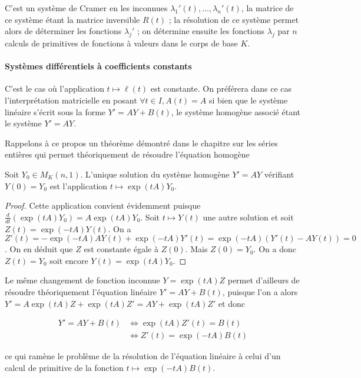 C'est un système de Cramer en les inconnues
$\lambda_1'(t),\ldots,\lambda_n'(t)$, la matrice de ce système étant la matrice inversible $R(t)$ ; la
résolution de ce système permet alors de déterminer les fonctions
$\lambda_j'$ ; on détermine ensuite les fonctions $\lambda_j$ par $n$
calculs de primitives de fonctions à valeurs dans le corps de base $K$.

\paragraph{Systèmes différentiels à coefficients constants}

C'est le cas où l'application $t \mapsto \ell(t)$ est
constante. On préférera dans ce cas l'interprétation matricielle en
posant $\forall t \in I, A(t) = A$ si bien que le système
linéaire s'écrit sous la forme $Y' = AY + B(t)$, le système homogène
associé étant le système $Y' = AY$.

Rappelons à ce propos un théorème démontré dans le chapitre sur les
séries entières qui permet théoriquement de résoudre l'équation homogène

\begin{thm}
Soit $Y_0 \in M_K(n,1)$. L'unique
solution du système homogène $Y' = AY$ vérifiant $Y(0) = Y_0$
est l'application
$t \mapsto \exp(tA)Y_0$.
\end{thm}

\begin{proof}
Cette application convient évidemment puisque $\frac{d}{dt}(\exp(tA)Y_0) = A\exp(tA)Y_0$. Soit
$t \mapsto Y(t)$ une autre solution et soit $Z(t) = \exp(-tA)Y(t)$. On a $Z'(t) = -\exp(-tA)AY(t) + \exp(-tA)Y'(t) = \exp(-tA)(Y'(t) - AY(t)) = 0$. On en déduit que $Z$ est constante égale à $Z(0)$. Mais $Z(0) = Y_0$. On a donc $Z(t) = Y_0$ soit encore $Y(t) = \exp(tA)Y_0$.
\end{proof}

\begin{rem}
Le même changement de fonction inconnue $Y = \exp(tA)Z$ permet d'ailleurs de résoudre
théoriquement l'équation linéaire $Y' = AY + B(t)$, puisque l'on a alors
$Y' = A\exp(tA)Z + \exp(tA)Z' = AY + \exp(tA)Z'$ et donc

\begin{align*} 
Y' = AY + B(t) &\Leftrightarrow \exp(tA)Z'(t) = B(t) \\
&\Leftrightarrow Z'(t) = \exp(-tA)B(t)
\end{align*}

ce qui ramène le problème de la résolution de l'équation linéaire à
celui d'un calcul de primitive de la fonction
$t \mapsto \exp(-tA)B(t)$.
\end{rem}

